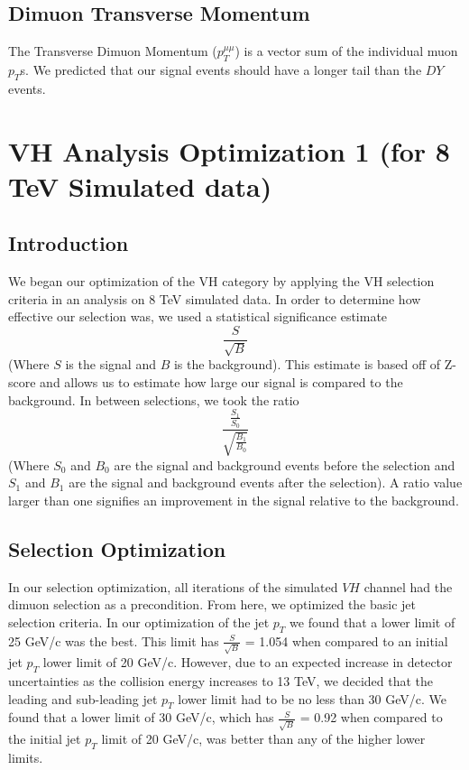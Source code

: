 \documentclass[12pt]{article}
\begin{document}
\subsection{Dimuon Transverse Momentum}

The Transverse Dimuon Momentum ($p_{T}^{\mu \mu}$) is a vector sum of the individual muon $p_{T}$s. 
We predicted that our signal events should have a longer tail than the $DY$ events.

\section{VH Analysis Optimization 1 (for 8 TeV Simulated data)}

\subsection{Introduction}

We began our optimization of the VH category by applying the VH selection criteria in an analysis on 8 TeV simulated data. 
In order to determine how effective our selection was, we used a statistical significance estimate 
	\[\frac{S}{\sqrt{B}} \] 
(Where $S$ is the signal and $B$ is the background). 
This estimate is based off of Z-score and allows us to estimate how large our signal is compared to the background. 
In between selections, we took the ratio 
	\[\frac{\frac{S_{1}}{S_{0}}}{\sqrt{\frac{B_{1}}{B_{0}}}} \] 
(Where $S_{0}$ and $B_{0}$ are the signal and background events before the selection 
and $S_{1}$ and $B_{1}$ are the signal and background events after the selection). 
A ratio value larger than one signifies an improvement in the signal relative to the background.

\subsection{Selection Optimization}

In our selection optimization, all iterations of the simulated $VH$ channel had the dimuon selection as a precondition. 
From here, we optimized the basic jet selection criteria. In our optimization of the jet $p_{T}$ we found that a lower limit of 25 GeV/c was the best. 
This limit has $\frac{S}{\sqrt{B}}$ = 1.054 when compared to an initial jet $p_{T}$ lower limit of 20 GeV/c. 
However, due to an expected increase in detector uncertainties as the collision energy increases to 13 TeV, 
we decided that the leading and sub-leading jet $p_{T}$ lower limit had to be no less than 30 GeV/c. 
We found that a lower limit of 30 GeV/c, which has $\frac{S}{\sqrt{B}}$ = 0.92 when compared to the initial jet $p_{T}$ limit of 20 GeV/c, 
was better than any of the higher lower limits. 
\end{document}
